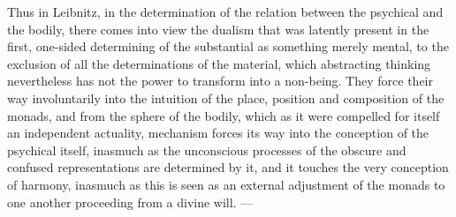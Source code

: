 Thus in Leibnitz, in the determination of the relation between the
psychical and the bodily, there comes into view the dualism that was
latently present in the first, one-sided determining of the substantial
as something merely mental, to the exclusion of all the determinations
of the material, which abstracting thinking nevertheless has not the
power to transform into a non-being. They force their way involuntarily
into the intuition of the place, position and composition of the
monads, and from the sphere of the bodily, which as it were compelled
for itself an independent actuality, mechanism forces its way into the
conception of the psychical itself, inasmuch as the unconscious
processes of the obscure and confused representations are determined by
it, and it touches the very conception of harmony, inasmuch as this is
seen as an external adjustment of the monads to one another proceeding
from a divine will. ---


